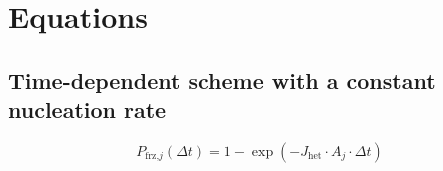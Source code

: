\documentclass{article}
\begin{document}

\section{Equations}
\label{sec:equations}

\subsection{Time-dependent scheme with a constant nucleation rate}
\begin{equation}
    P_{\text{frz,}j}(\Delta t) = 1 - \exp\left(-J_{\text{het}} \cdot A_j \cdot \Delta t \right) \label{eq:1}
\end{equation}
\end{document}
